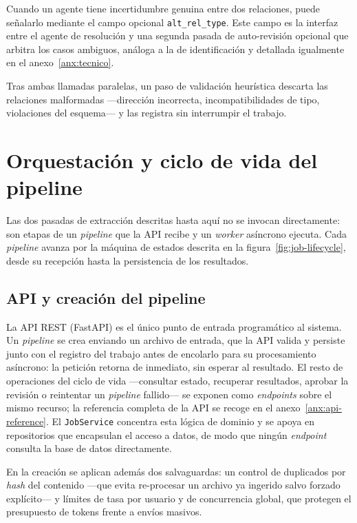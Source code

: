 Cuando un agente tiene incertidumbre genuina entre dos relaciones, puede señalarlo mediante el
campo opcional \texttt{alt\_rel\_type}. Este campo es la interfaz entre el agente de resolución
y una segunda pasada de auto-revisión opcional que arbitra los casos ambiguos, análoga a la de
identificación y detallada igualmente en el anexo~\ref{anx:tecnico}.

Tras ambas llamadas paralelas, un paso de validación heurística descarta las relaciones
malformadas —dirección incorrecta, incompatibilidades de tipo, violaciones del esquema— y las
registra sin interrumpir el trabajo.

\section{Orquestación y ciclo de vida del pipeline}
\label{sec:orquestacion}

Las dos pasadas de extracción descritas hasta aquí no se invocan directamente: son etapas de un
\textit{pipeline} que la \ac{API} recibe y un \textit{worker} asíncrono ejecuta. Cada \textit{pipeline}
avanza por la máquina de estados descrita en la figura~\ref{fig:job-lifecycle}, desde su recepción
hasta la persistencia de los resultados.

\subsection{API y creación del pipeline}

La \ac{API} REST (FastAPI) es el único punto de entrada programático al sistema. Un \textit{pipeline}
se crea enviando un archivo de entrada, que la \ac{API} valida y persiste junto con el registro del
trabajo antes de encolarlo para su procesamiento asíncrono: la petición retorna de inmediato, sin
esperar al resultado. El resto de operaciones del ciclo de vida —consultar estado, recuperar
resultados, aprobar la revisión o reintentar un \textit{pipeline} fallido— se exponen como
\textit{endpoints} sobre el mismo recurso; la referencia completa de la \ac{API} se recoge en el
anexo~\ref{anx:api-reference}. El \texttt{JobService} concentra esta lógica de dominio y se apoya
en repositorios que encapsulan el acceso a datos, de modo que ningún \textit{endpoint} consulta la
base de datos directamente.

En la creación se aplican además dos salvaguardas: un control de duplicados por
\textit{hash} del contenido —que evita re-procesar un archivo ya ingerido salvo forzado
explícito— y límites de tasa por usuario y de concurrencia global, que protegen el presupuesto
de tokens frente a envíos masivos.

